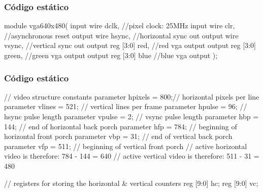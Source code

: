 
\begin{frame}[fragile]
	\frametitle{Código estático}
	\begin{verilogcode}
module vga640x480(
	input wire dclk,        //pixel clock: 25MHz
	input wire clr,         //asynchronous reset
	output wire hsync,      //horizontal sync out
	output wire vsync,      //vertical sync out
	output reg [3:0] red,   //red vga output
	output reg [3:0] green, //green vga output
	output reg [3:0] blue   //blue vga output
	);	
    \end{verilogcode} 
\end{frame}

\begin{frame}[fragile]
	\frametitle{Código estático}
	\begin{verilogcode}
// video structure constants
parameter hpixels = 800;// horizontal pixels per line
parameter vlines = 521; // vertical lines per frame
parameter hpulse = 96;  // hsync pulse length
parameter vpulse = 2;   // vsync pulse length
parameter hbp = 144;    // end of horizontal back porch
parameter hfp = 784;    // beginning of horizontal front porch
parameter vbp = 31;     // end of vertical back porch
parameter vfp = 511;    // beginning of vertical front porch
// active horizontal video is therefore: 784 - 144 = 640
// active vertical video is therefore: 511 - 31 = 480

// registers for storing the horizontal & vertical counters
reg [9:0] hc;
reg [9:0] vc;
    \end{verilogcode} 
\end{frame}


